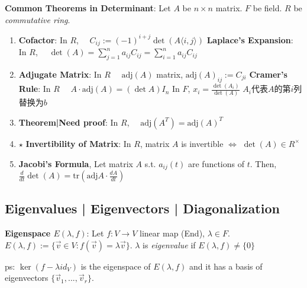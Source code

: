 \documentclass[9pt]{article}
\begin{document}
\textbf{Common Theorems in Determinant}: Let $A$ be $n\times n$ matrix. \quad $F$ be field. \quad $R$ be \textit{commutative ring}.
\begin{enumerate}[itemsep=-2pt, topsep=-2pt]
    \item {\small \textbf{Cofactor}: In $R$, \ \ $C_{ij}:=(-1)^{i+j}\det(A\langle i,j\rangle)$  \quad \textbf{Laplace's Expansion}: In $R$, \ \ $\det(A)=\sum_{j=1}^n a_{ij}C_{ij}= \sum_{i=1}^n a_{ij}C_{ij}$}
    \item {\small \textbf{Adjugate Matrix}: In $R$ \ \ $\text{adj}(A)$ matrix, $\text{adj}(A)_{ij}:=C_{ji}$ \quad \textbf{Cramer's Rule}: In $R$ \ \ $A\cdot\text{adj}(A)=(\det A)I_n$ \quad In $F$, $x_i=\frac{\det(A_i)}{\det(A)}$ {\tiny $A_i$代表$A$的第$i$列替换为$b$}}
    \item \np \textbf{Theorem|Need proof}: In $R$, \ \ $\text{adj}(A^T)=\text{adj}(A)^T$ 
    \item $\star$ \textbf{Invertibility of Matrix}: In $R$, matrix $A$ is invertible $\Leftrightarrow$ $\det(A)\in R^\times$ 
    \item \textbf{Jacobi's Formula}, Let matrix $A$ s.t. $a_{ij}(t)$ are functions of $t$. \quad Then, $\frac{d}{dt}\det(A)=\text{tr}\left(\text{adj}A\cdot\frac{dA}{dt}\right)$
\end{enumerate}


\subsection{Eigenvalues | Eigenvectors | Diagonalization} %

\textbf{Eigenspace $E(\lambda,f)$}: Let $f:V\to V$ linear map (End), $\lambda\in F$. \quad $E(\lambda,f):=\{\vec{v}\in V:f(\vec{v})=\lambda\vec{v}\}$. \quad $\lambda$ is \textit{eigenvalue} if $E(\lambda,f)\ne\{0\}$

\quad ps: $\ker(f-\lambda id_V)$ is the eigenspace of $E(\lambda,f)$ and it has a basis of eigenvectors $\{\vec{v}_1,...,\vec{v}_r\}$.
\end{document}
